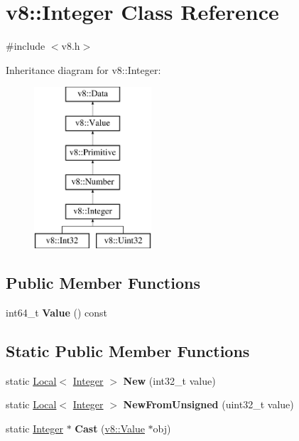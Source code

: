 \hypertarget{classv8_1_1_integer}{}\section{v8\+:\+:Integer Class Reference}
\label{classv8_1_1_integer}


{\ttfamily \#include $<$v8.\+h$>$}

Inheritance diagram for v8\+:\+:Integer\+:\begin{figure}[H]
\begin{center}
\leavevmode
\includegraphics[height=6.000000cm]{classv8_1_1_integer}
\end{center}
\end{figure}
\subsection*{Public Member Functions}
\begin{DoxyCompactItemize}
\item 
\hypertarget{classv8_1_1_integer_a93bcfb39090631a3ff95843463183c9c}{}int64\+\_\+t {\bfseries Value} () const \label{classv8_1_1_integer_a93bcfb39090631a3ff95843463183c9c}

\end{DoxyCompactItemize}
\subsection*{Static Public Member Functions}
\begin{DoxyCompactItemize}
\item 
\hypertarget{classv8_1_1_integer_a1099725f8f38584a6123ecf0e7a62592}{}static \hyperlink{classv8_1_1_local}{Local}$<$ \hyperlink{classv8_1_1_integer}{Integer} $>$ {\bfseries New} (int32\+\_\+t value)\label{classv8_1_1_integer_a1099725f8f38584a6123ecf0e7a62592}

\item 
\hypertarget{classv8_1_1_integer_ac5fffb125b9469f3321a845838117887}{}static \hyperlink{classv8_1_1_local}{Local}$<$ \hyperlink{classv8_1_1_integer}{Integer} $>$ {\bfseries New\+From\+Unsigned} (uint32\+\_\+t value)\label{classv8_1_1_integer_ac5fffb125b9469f3321a845838117887}

\item 
\hypertarget{classv8_1_1_integer_a886f73d3d8bb91f8235f66d8dccec12a}{}static \hyperlink{classv8_1_1_integer}{Integer} $\ast$ {\bfseries Cast} (\hyperlink{classv8_1_1_value}{v8\+::\+Value} $\ast$obj)\label{classv8_1_1_integer_a886f73d3d8bb91f8235f66d8dccec12a}

\end{DoxyCompactItemize}


